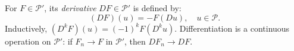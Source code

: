 For $F \in \mathcal{P}'$, its \textit{derivative} $DF \in \mathcal{P}'$ is defined by:
\[
(DF)(u) = -F(Du), \quad u \in \mathcal{P}.
\]
Inductively, $(D^k F)(u) = (-1)^k F(D^k u)$. Differentiation is a continuous operation on $\mathcal{P}'$: if $F_n \to F$ in $\mathcal{P}'$, then $DF_n \to DF$.
